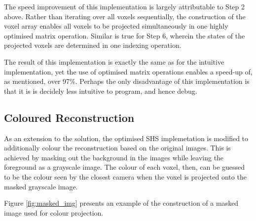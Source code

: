 The speed improvement of this implementation is largely attributable to Step 2 above. Rather than iterating over all voxels sequentially, the construction of the voxel array enables all voxels to be projected simultaneously in one highly optimised matrix operation. Similar is true for Step 6, wherein the states of the projected voxels are determined in one indexing operation.

The result of this implementation is exactly the same as for the intuitive implementation, yet the use of optimised matrix operations enables a speed-up of, as mentioned, over 97\%. Perhaps the only disadvantage of this implementation is that it is is decidely less intuitive to program, and hence debug.

\newpage
\subsection{Coloured Reconstruction}

As an extension to the solution, the optimised SHS implemetation is modified to additionally colour the reconstruction based on the original images. This is achieved by masking out the background in the images while leaving the foreground as a grayscale image. The colour of each voxel, then, can be guessed to be the colour seen by the closest camera when the voxel is projected onto the masked grayscale image.

Figure \ref{fig:masked_img} presents an example of the construction of a masked image used for colour projection.

